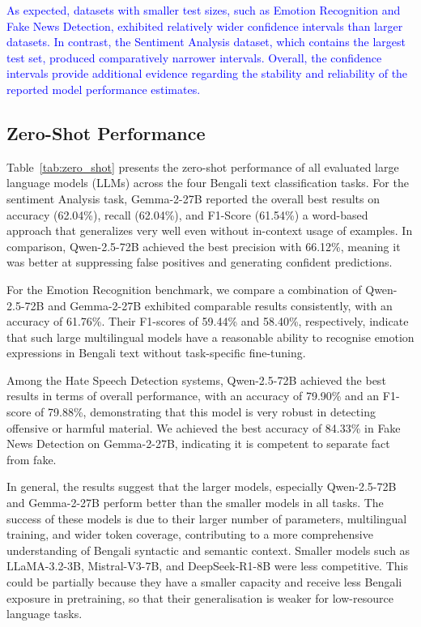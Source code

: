 \documentclass[10pt,letterpaper]{article}
\newcommand{\rev}[1]{\textcolor{blue}{#1}}
\begin{document}
\rev{As expected, datasets with smaller test sizes, such as Emotion Recognition and Fake News Detection, exhibited relatively wider confidence intervals than larger datasets. In contrast, the Sentiment Analysis dataset, which contains the largest test set, produced comparatively narrower intervals. Overall, the confidence intervals provide additional evidence regarding the stability and reliability of the reported model performance estimates.}



\subsection*{Zero-Shot Performance}
\label{sec:zero_shot}

Table~\ref{tab:zero_shot} presents the zero-shot performance of all evaluated large language models (LLMs) across the four Bengali text classification tasks. For the sentiment Analysis task, Gemma-2-27B reported the overall best results on accuracy (62.04\%), recall (62.04\%), and F1-Score (61.54\%) a word-based approach that generalizes very well even without in-context usage of examples. In comparison, Qwen-2.5-72B achieved the best precision with 66.12\%, meaning it was better at suppressing false positives and generating confident predictions.

For the Emotion Recognition benchmark, we compare a combination of Qwen-2.5-72B and Gemma-2-27B exhibited comparable results consistently, with an accuracy of 61.76\%. Their F1-scores of 59.44\% and 58.40\%, respectively, indicate that such large multilingual models have a reasonable ability to recognise emotion expressions in Bengali text without task-specific fine-tuning.

Among the Hate Speech Detection systems, Qwen-2.5-72B achieved the best results in terms of overall performance, with an accuracy of 79.90\% and an F1-score of 79.88\%, demonstrating that this model is very robust in detecting offensive or harmful material. We achieved the best accuracy of 84.33\% in Fake News Detection on Gemma-2-27B, indicating it is competent to separate fact from fake.

In general, the results suggest that the larger models, especially Qwen-2.5-72B and Gemma-2-27B perform better than the smaller models in all tasks. The success of these models is due to their larger number of parameters, multilingual training, and wider token coverage, contributing to a more comprehensive understanding of Bengali syntactic and semantic context. Smaller models such as LLaMA-3.2-3B, Mistral-V3-7B, and DeepSeek-R1-8B were less competitive. This could be partially because they have a smaller capacity and receive less Bengali exposure in pretraining, so that their generalisation is weaker for low-resource language tasks.
\end{document}
